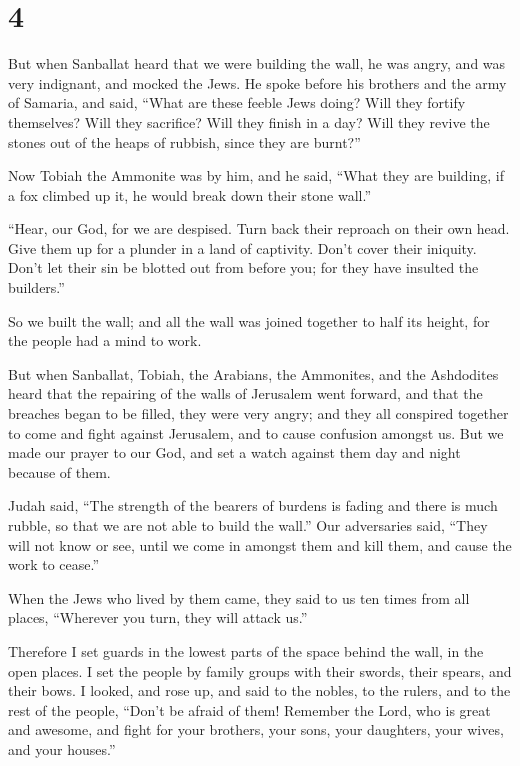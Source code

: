 \hypertarget{section-3}{%
\section{4}\label{section-3}}

 But when Sanballat heard that we were building the wall,
he was angry, and was very indignant, and mocked the Jews.
 He spoke before his brothers and the army of Samaria, and
said, ``What are these feeble Jews doing? Will they fortify themselves?
Will they sacrifice? Will they finish in a day? Will they revive the
stones out of the heaps of rubbish, since they are burnt?''

 Now Tobiah the Ammonite was by him, and he said, ``What
they are building, if a fox climbed up it, he would break down their
stone wall.''

 ``Hear, our God, for we are despised. Turn back their
reproach on their own head. Give them up for a plunder in a land of
captivity.  Don't cover their iniquity. Don't let their
sin be blotted out from before you; for they have insulted the
builders.''

 So we built the wall; and all the wall was joined
together to half its height, for the people had a mind to work.

 But when Sanballat, Tobiah, the Arabians, the Ammonites,
and the Ashdodites heard that the repairing of the walls of Jerusalem
went forward, and that the breaches began to be filled, they were very
angry;  and they all conspired together to come and fight
against Jerusalem, and to cause confusion amongst us.  But
we made our prayer to our God, and set a watch against them day and
night because of them.

 Judah said, ``The strength of the bearers of burdens is
fading and there is much rubble, so that we are not able to build the
wall.''  Our adversaries said, ``They will not know or
see, until we come in amongst them and kill them, and cause the work to
cease.''

 When the Jews who lived by them came, they said to us
ten times from all places, ``Wherever you turn, they will attack us.''

 Therefore I set guards in the lowest parts of the space
behind the wall, in the open places. I set the people by family groups
with their swords, their spears, and their bows.  I
looked, and rose up, and said to the nobles, to the rulers, and to the
rest of the people, ``Don't be afraid of them! Remember the Lord, who is
great and awesome, and fight for your brothers, your sons, your
daughters, your wives, and your houses.''

